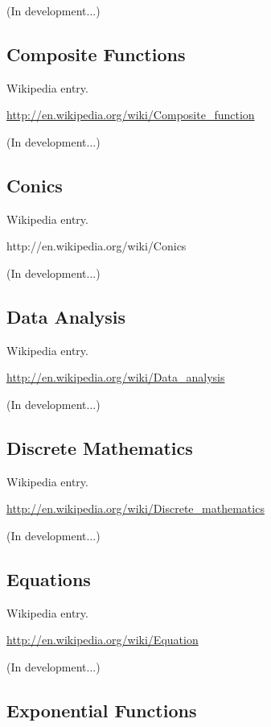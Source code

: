 \documentclass[12pt,oneside]{book}
\begin{document}
(In development...)

\subsection[Composite Functions]{Composite Functions}

Wikipedia entry.

\href{http://en.wikipedia.org/wiki/Composite_function}{http://en.wikipedia.org/wiki/Composite\_function}

(In development...)

\subsection[Conics]{Conics}

Wikipedia entry.

http://en.wikipedia.org/wiki/Conics

(In development...)

\subsection[Data Analysis]{Data Analysis}

Wikipedia entry.

\href{http://en.wikipedia.org/wiki/Data_analysis}{http://en.wikipedia.org/wiki/Data\_analysis}

(In development...)

\subsection[Discrete Mathematics]{Discrete Mathematics}

Wikipedia entry.

\href{http://en.wikipedia.org/wiki/Discrete_mathematics}{http://en.wikipedia.org/wiki/Discrete\_mathematics}

(In development...)

\subsection[Equations]{Equations}

Wikipedia entry.

\href{http://en.wikipedia.org/wiki/Equation}{http://en.wikipedia.org/wiki/Equation}

(In development...)

\subsection[Exponential Functions]{Exponential Functions}
\end{document}

